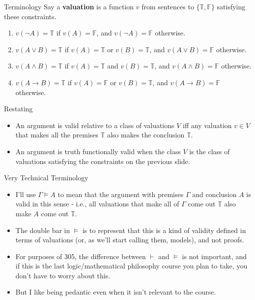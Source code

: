 \documentclass[
  ignorenonframetext,
]{beamer}
\providecommand{\tightlist}{%
  \setlength{\itemsep}{0pt}\setlength{\parskip}{0pt}}
\renewcommand{\,}{\text{, }}
\def\True{\mathbb{T}}
\def\False{\mathbb{F}}
\begin{document}
\begin{frame}{Terminology}
\protect\hypertarget{terminology}{}
Say a \textbf{valuation} is a function \(v\) from sentences to
\(\{\True, \False\}\) satisfying these constraints.

\begin{enumerate}
\tightlist
\item
  \(v(\neg A) = \True\) if \(v(A) = \False\), and \(v(\neg A) = \False\)
  otherwise.
\item
  \(v(A \vee B) = \True\) if \(v(A) = \True\) or \(v(B) = \True\), and
  \(v(A \vee B) = \False\) otherwise.
\item
  \(v(A \wedge B) = \True\) if \(v(A) = \True\) and \(v(B) = \True\),
  and \(v(A \wedge B) = \False\) otherwise.
\item
  \(v(A \rightarrow B) = \True\) if \(v(A) = \False\) or
  \(v(B) = \True\), and \(v(A \rightarrow B) = \False\) otherwise.
\end{enumerate}
\end{frame}

\begin{frame}{Restating}
\protect\hypertarget{restating}{}
\begin{itemize}[<+->]
\tightlist
\item
  An argument is valid relative to a class of valuations \(V\) iff any
  valuation \(v \in V\) that makes all the premises \(\True\) also makes
  the conclusion \(\True\).
\item
  An argument is truth functionally valid when the class \(V\) is the
  class of valuations satisfying the constraints on the previous slide.
\end{itemize}
\end{frame}

\begin{frame}{Very Technical Terminology}
\protect\hypertarget{very-technical-terminology}{}
\begin{itemize}
\tightlist
\item
  I'll use \(\Gamma \vDash A\) to mean that the argument with premises
  \(\Gamma\) and conclusion \(A\) is valid in this sense - i.e., all
  valuations that make all of \(\Gamma\) come out \(\True\) also make
  \(A\) come out \(\True\).
\item
  The double bar in \(\vDash\) is to represent that this is a kind of
  validity defined in terms of valuations (or, as we'll start calling
  them, models), and not proofs.
\item
  For purposes of 305, the difference between \(\vdash\) and \(\vDash\)
  is not important, and if this is the last logic/mathematical
  philosophy course you plan to take, you don't have to worry about
  this.
\item
  But I like being pedantic even when it isn't relevant to the course.
\end{itemize}
\end{frame}
\end{document}
